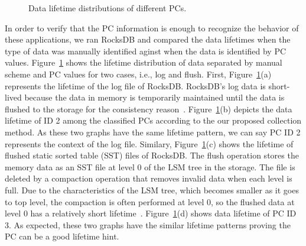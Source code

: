 \begin{figure}[!t]
\centering
\hspace{1pt}
\hfill
\vspace{-10pt}
\caption{Data lifetime distributions of different PCs.} \label{fig:types_and_PCs}
\vspace{-20pt}
\end{figure}

In order to verify that the PC information is enough to recognize the behavior of these applications, 
we ran RocksDB and compared the data lifetimes when the type of data was manually identified 
aginst when the data is identified by PC values.
Figure~\ref{fig:types_and_PCs} shows the lifetime distribution of data separated by manual scheme and 
PC values for two cases, i.e., log and flush.
First, Figure~\ref{fig:types_and_PCs}(a) represents the lifetime of the log file of RocksDB. 
RocksDB's log data is short-lived because the data in memory is temporarily maintained
until the data is flushed to the storage for the consistency reason~\cite{RocksDB}.
Figure~\ref{fig:types_and_PCs}(b) depicts the data lifetime of ID 2 among the classified PCs 
according to the our proposed collection method.
As these two graphs have the same lifetime pattern, we can say PC ID 2 represents the context of the log file.
Similary, Figure~\ref{fig:types_and_PCs}(c) shows the lifetime of flushed static sorted table (SST)
files of RocksDB.
The flush operation stores the memory data as an SST file at level 0 of the LSM tree in the storage.
The file is deleted by a compaction operation that removes invalid data when each level is full.
Due to the characteristics of the LSM tree, which becomes smaller as it goes to top level,
the compaction is often performed at level 0,
so the flushed data at level 0 has a relatively short lifetime~\cite{RocksDB}.
Figure~\ref{fig:types_and_PCs}(d) shows data lifetime of PC ID 3.
As expected, these two graphs have the similar lifetime patterns proving the PC can be a good lifetime hint.


